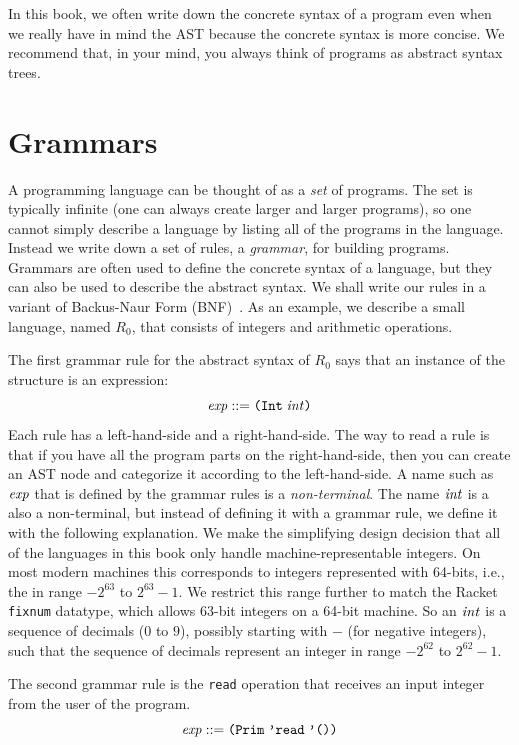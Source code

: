 \documentclass[11pt]{book}
\begin{document}
In this book, we often write down the concrete syntax of a program
even when we really have in mind the AST because the concrete syntax
is more concise.  We recommend that, in your mind, you always think of
programs as abstract syntax trees.

\section{Grammars}
\label{sec:grammar}

A programming language can be thought of as a \emph{set} of programs.
The set is typically infinite (one can always create larger and larger
programs), so one cannot simply describe a language by listing all of
the programs in the language. Instead we write down a set of rules, a
\emph{grammar}, for building programs. Grammars are often used to
define the concrete syntax of a language, but they can also be used to
describe the abstract syntax. We shall write our rules in a variant of
Backus-Naur Form (BNF)~\citep{Backus:1960aa,Knuth:1964aa}.  As an
example, we describe a small language, named $R_0$, that consists of
integers and arithmetic operations.

The first grammar rule for the abstract syntax of $R_0$ says that an
instance of the  structure is an expression:
\begin{equation}
\mathit{exp} ::= \texttt{(Int}\;\mathit{int}\texttt{)}  \label{eq:arith-int}
\end{equation}
%
Each rule has a left-hand-side and a right-hand-side. The way to read
a rule is that if you have all the program parts on the
right-hand-side, then you can create an AST node and categorize it
according to the left-hand-side.
%
A name such as $\mathit{exp}$ that is
defined by the grammar rules is a \emph{non-terminal}.
%
The name $\mathit{int}$ is a also a non-terminal, but instead of defining it
with a grammar rule, we define it with the following explanation.  We
make the simplifying design decision that all of the languages in this
book only handle machine-representable integers.  On most modern
machines this corresponds to integers represented with 64-bits, i.e.,
the in range $-2^{63}$ to $2^{63}-1$.  We restrict this range further
to match the Racket \texttt{fixnum} datatype, which allows 63-bit
integers on a 64-bit machine. So an $\mathit{int}$ is a sequence of decimals
($0$ to $9$), possibly starting with $-$ (for negative integers), such
that the sequence of decimals represent an integer in range $-2^{62}$
to $2^{62}-1$.

The second grammar rule is the \texttt{read} operation that receives
an input integer from the user of the program.
\begin{equation}
  \mathit{exp} ::= \texttt{(Prim}\;\texttt{'read}\;\texttt{'())}{} \label{eq:arith-read}
\end{equation}
\end{document}
